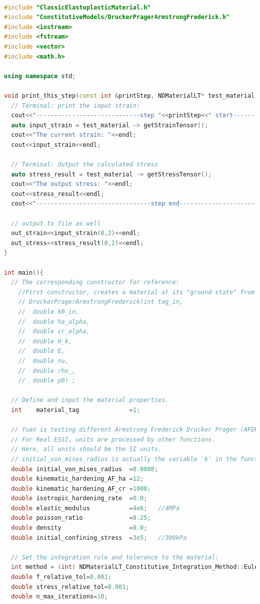 \documentclass[fleqn,11pt]{article}
\begin{document}
\begin{lstlisting}[language=C++, frame=single]  

#include "ClassicElastoplasticMaterial.h"
#include "ConstitutiveModels/DruckerPragerArmstrongFrederick.h"
#include <iostream>
#include <fstream>
#include <vector>
#include <math.h>  

using namespace std;

void print_this_step(const int &printStep, NDMaterialLT* test_material, ofstream & out_strain,ofstream & out_stress){
  // Terminal: print the input strain:
  cout<<"-----------------------------step "<<printStep<<" start------------------------------"<<endl;
  auto input_strain = test_material -> getStrainTensor();
  cout<<"The current strain: "<<endl;
  cout<<input_strain<<endl;

  // Terminal: Output the calculated stress
  auto stress_result = test_material -> getStressTensor();
  cout<<"The output stress: "<<endl;
  cout<<stress_result<<endl;
  cout<<"--------------------------------step end-------------------------------"<<endl;

  // output to file as well
  out_strain<<input_strain(0,2)<<endl;
  out_stress<<stress_result(0,2)<<endl;
}

int main(){
  // The corresponding constructor for reference:
    //First constructor, creates a material at its "ground state" from its parameters.
    // DruckerPragerArmstrongFrederick(int tag_in,
    //  double k0_in,
    //  double ha_alpha,
    //  double cr_alpha,
    //  double H_k,
    //  double E,
    //  double nu,
    //  double rho_,
    //  double p0) ;

  // Define and input the material properties. 
  int    material_tag              =1;

  // Yuan is testing different Armstrong Frederick Drucker Prager (AFDP) parameters:
  // For Real ESSI, units are processed by other functions.
  // Here, all units should be the SI units.
  // initial_von_mises_radius is actually the variable 'k' in the function of yield suface 
  double initial_von_mises_radius  =0.0008;
  double kinematic_hardening_AF_ha =12;   
  double kinematic_hardening_AF_cr =1000; 
  double isotropic_hardening_rate  =0.0;
  double elastic_modulus           =4e6;   //4MPa   
  double poisson_ratio             =0.25;
  double density                   =0.0;
  double initial_confining_stress  =3e5;   //300kPa

  // Set the integration rule and tolerance to the material:
  int method = (int) NDMaterialLT_Constitutive_Integration_Method::Euler_One_Step;
  double f_relative_tol=0.001;
  double stress_relative_tol=0.001;
  double n_max_iterations=10;


\end{lstlisting}
\end{document}
